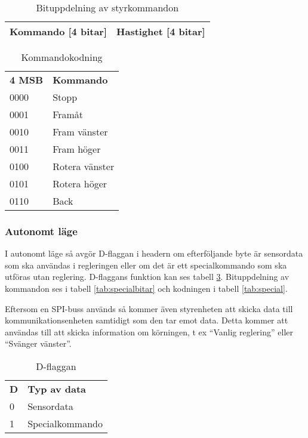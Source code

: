 \begin{table}[h] 
  \centering
  \begin{tabular}{| c | c |}
    \hline
    Kommando [4 bitar] & Hastighet [4 bitar] \\ \hline
  \end{tabular}
  \caption{Bituppdelning av styrkommandon}
  \label{tab:styrbitar}
\end{table}

\begin{table}[h] 
  \centering
  \begin{tabular}{l l}
    \textbf{4 MSB} & \textbf{Kommando} \\
    0000 & Stopp \\
    0001 & Framåt \\
    0010 & Fram vänster \\
    0011 & Fram höger \\
    0100 & Rotera vänster \\
    0101 & Rotera höger \\
    0110 & Back \\
  \end{tabular}
  \caption{Kommandokodning}
  \label{tab:styrkommando}
\end{table}

\subsubsection{Autonomt läge}
I autonomt läge så avgör D-flaggan i headern om efterföljande byte är sensordata som ska användas i regleringen eller
om det är ett specialkommando som ska utföras utan reglering. D-flaggans funktion kan ses tabell \ref{tab:dflagga}.
Bituppdelning av kommandon ses i tabell \ref{tab:specialbitar} och kodningen i tabell \ref{tab:special}.

Eftersom en SPI-buss används så kommer även styrenheten att skicka data till kommunikationsenheten samtidigt som den tar emot data.
Detta kommer att användas till att skicka information om körningen, t ex ``Vanlig reglering'' eller ``Svänger vänster''.

\begin{table}[h]
  \centering
  \begin{tabular}{l l}
    \textbf{D} & \textbf{Typ av data} \\
    0 & Sensordata \\
    1 & Specialkommando \\
  \end{tabular}
  \caption{D-flaggan}
  \label{tab:dflagga}
\end{table}

